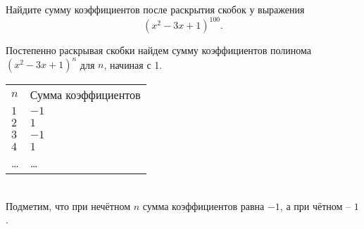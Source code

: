 
Найдите сумму коэффициентов после раскрытия скобок у выражения $$(x^2-3x+1)^{100}.$$

\solutionSection

Постепенно раскрывая скобки найдем сумму коэффициентов полинома \linebreak $(x^2-3x+1)^n$ для $n$, начиная с 1.\\

\begin{tabular}{l l}
    $n$ & Сумма коэффициентов \\
    $1$ & $-1$  \\
    $2$ & $1$  \\
    $3$ & $-1$  \\
    $4$ & $1$  \\
    \dots & \dots \\
\end{tabular}\\

Подметим, что при нечётном $n$ сумма коэффициентов равна $-1$, а при \linebreak чётном -- $1$.

